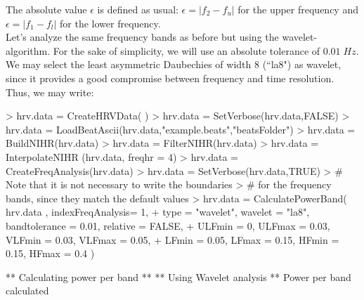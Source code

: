 \documentclass[12pt,lot, lof]{puthesis}
\begin{document}
The absolute value $\epsilon$ is defined as usual: $\epsilon=|f_2-f_u|$ for the 
upper frequency and $\epsilon=|f_1-f_l|$ for the lower frequency.\\

Let's analyze the same frequency bands as before but using the 
wavelet-algorithm. For the sake of simplicity, we will use an absolute 
tolerance of $0.01\;Hz$. We may select the least asymmetric Daubechies of width 
8 (``la8") as 
wavelet, since it provides a good compromise between frequency and time 
resolution. Thus, we may write:
\begin{Schunk}
\begin{Sinput}
> hrv.data = CreateHRVData( )
> hrv.data = SetVerbose(hrv.data,FALSE)
> hrv.data = LoadBeatAscii(hrv.data,"example.beats","beatsFolder")
> hrv.data = BuildNIHR(hrv.data)
> hrv.data = FilterNIHR(hrv.data)
> hrv.data = InterpolateNIHR (hrv.data, freqhr = 4)
> hrv.data = CreateFreqAnalysis(hrv.data)
> hrv.data = SetVerbose(hrv.data,TRUE)
> # Note that it is not necessary to write the boundaries
> # for the frequency bands, since they match the default values
> hrv.data = CalculatePowerBand( hrv.data , indexFreqAnalysis= 1,
+  type = "wavelet", wavelet = "la8", bandtolerance = 0.01, relative = FALSE,
+ ULFmin = 0, ULFmax = 0.03, VLFmin = 0.03, VLFmax = 0.05,
+  LFmin = 0.05, LFmax = 0.15, HFmin = 0.15,   HFmax = 0.4 )
\end{Sinput}
\begin{Soutput}
** Calculating power per band **
** Using Wavelet analysis **
Power per band calculated
\end{Soutput}
\end{Schunk}
\end{document}
